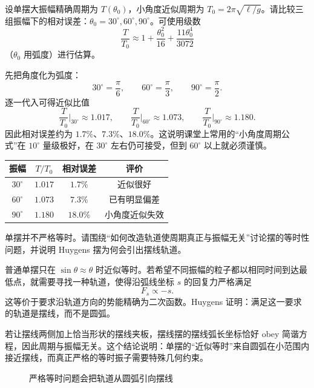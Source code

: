 \begin{problem}
设单摆大振幅精确周期为 $T(\theta_0)$，小角度近似周期为 $T_0=2\pi\sqrt{\ell/g}$。请比较三组振幅下的相对误差：$\theta_0=30^\circ,60^\circ,90^\circ$。可使用级数
\[
\frac{T}{T_0}\approx 1+\frac{\theta_0^2}{16}+\frac{11\theta_0^4}{3072}
\]
（$\theta_0$ 用弧度）进行估算。
\begin{solution}
先把角度化为弧度：
\[
30^\circ=\frac{\pi}{6},\qquad 60^\circ=\frac{\pi}{3},\qquad 90^\circ=\frac{\pi}{2}.
\]
逐一代入可得近似比值
\[
\frac{T}{T_0}\bigg|_{30^\circ}\approx 1.017,
\qquad
\frac{T}{T_0}\bigg|_{60^\circ}\approx 1.073,
\qquad
\frac{T}{T_0}\bigg|_{90^\circ}\approx 1.180.
\]
因此相对误差约为 $1.7\%$、$7.3\%$、$18.0\%$。这说明课堂上常用的“小角度周期公式”在 $10^\circ$ 量级极好，在 $30^\circ$ 左右仍可接受，但到 $60^\circ$ 以上就必须谨慎。

\begin{center}
\begin{tabular}{cccc}
\toprule
振幅 & $T/T_0$ & 相对误差 & 评价\\
\midrule
$30^\circ$ & $1.017$ & $1.7\%$ & 近似很好\\
$60^\circ$ & $1.073$ & $7.3\%$ & 已有明显偏差\\
$90^\circ$ & $1.180$ & $18.0\%$ & 小角度近似失效\\
\bottomrule
\end{tabular}
\end{center}
\end{solution}
\end{problem}

\begin{problem}
单摆并不严格等时。请围绕“如何改造轨道使周期真正与振幅无关”讨论摆的等时性问题，并说明 Huygens 摆为何会引出摆线轨道。
\begin{solution}
普通单摆只在 $\sin\theta\approx \theta$ 时近似等时。若希望不同振幅的粒子都以相同时间到达最低点，就需要寻找一种轨道，使得沿弧线坐标 $s$ 的回复力严格满足
\[
F_s\propto -s.
\]
这等价于要求沿轨道方向的势能精确为二次函数。Huygens 证明：满足这一要求的轨道是摆线，而不是圆弧。

若让摆线两侧加上恰当形状的摆线夹板，摆线摆的摆线弧长坐标恰好 obey 简谐方程，因此周期与振幅无关。这个结论说明：单摆的“近似等时”来自圆弧在小范围内接近摆线，而真正严格的等时振子需要特殊几何约束。

\begin{figure}[H]
\centering
{}
\caption{严格等时问题会把轨道从圆弧引向摆线}
\end{figure}
\end{solution}
\end{problem}

